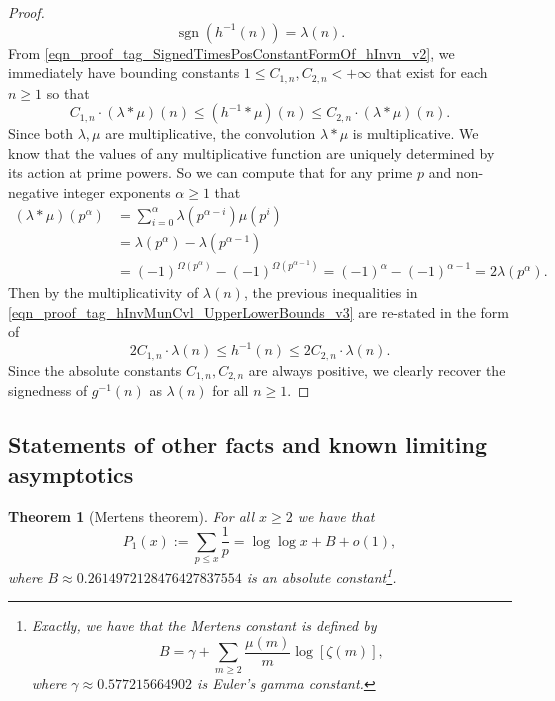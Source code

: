 \documentclass[11pt,reqno,a4letter]{article}
\numberwithin{figure}{section}
\numberwithin{table}{section}
\theoremstyle{plain}
\newtheorem{theorem}{Theorem}
\numberwithin{theorem}{section}
\theoremstyle{definition}
\begin{document}
\begin{proof}
\begin{equation} 
\label{eqn_proof_tag_SignedTimesPosConstantFormOf_hInvn_v2}
\operatorname{sgn}(h^{-1}(n)) = \lambda(n). 
\end{equation}
From \eqref{eqn_proof_tag_SignedTimesPosConstantFormOf_hInvn_v2}, we immediately have bounding constants 
$1 \leq C_{1,n}, C_{2,n} < +\infty$ that exist for each $n \geq 1$ so that 
\begin{equation} 
\label{eqn_proof_tag_hInvMunCvl_UpperLowerBounds_v3} 
C_{1,n} \cdot (\lambda \ast \mu)(n) \leq (h^{-1} \ast \mu)(n) \leq C_{2,n} \cdot (\lambda \ast \mu)(n). 
\end{equation} 
Since both $\lambda,\mu$ are multiplicative, the convolution $\lambda \ast \mu$ is multiplicative. 
We know that the values of 
any multiplicative function are uniquely determined by its action at prime powers. 
So we can compute that for any prime $p$ and non-negative integer exponents $\alpha \geq 1$ that 
\begin{align*} 
(\lambda \ast \mu)(p^{\alpha}) & = \sum_{i=0}^{\alpha} \lambda(p^{\alpha-i}) \mu(p^{i}) \\ 
     & = \lambda(p^{\alpha}) - \lambda(p^{\alpha-1}) \\ 
     & = 
     (-1)^{\Omega(p^{\alpha})} - (-1)^{\Omega(p^{\alpha-1})} = 
     (-1)^{\alpha} - (-1)^{\alpha-1} = 
     2 \lambda(p^{\alpha}). 
\end{align*} 
Then by the multiplicativity of $\lambda(n)$, the previous inequalities in 
\eqref{eqn_proof_tag_hInvMunCvl_UpperLowerBounds_v3} are re-stated in the form of 
\[
2 C_{1,n} \cdot \lambda(n) \leq h^{-1}(n) \leq 2 C_{2,n} \cdot \lambda(n). 
\] 
Since the absolute constants $C_{1,n}, C_{2,n}$ are always positive, 
we clearly recover the signedness of $g^{-1}(n)$ as $\lambda(n)$ for all $n \geq 1$. 
\end{proof} 

\subsection{Statements of other facts and known limiting asymptotics} 
\label{subSection_OtherFactsAndResults} 

\begin{theorem}[Mertens theorem]
\label{theorem_Mertens_theorem} 
For all $x \geq 2$ we have that 
\[
P_1(x) := \sum_{p \leq x} \frac{1}{p} = \log\log x + B + o(1), 
\]
where 
$B \approx 0.2614972128476427837554$ 
is an absolute constant\footnote{ 
     Exactly, we have that the \emph{Mertens constant} is defined by 
     \[
     B = \gamma + \sum_{m \geq 2} \frac{\mu(m)}{m} \log\left[\zeta(m)\right], 
     \]
     where $\gamma \approx 0.577215664902$ is Euler's gamma constant. 
}.
\end{theorem} 
\end{document}
